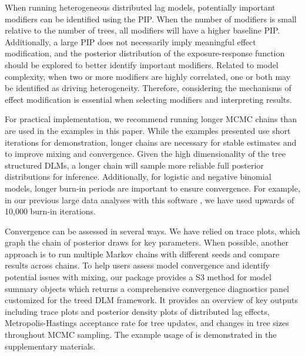 When running heterogeneous distributed lag models, potentially important modifiers can be identified using the PIP.  When the number of modifiers is small relative to the number of trees, all modifiers will have a higher baseline PIP. Additionally, a large PIP does not necessarily imply meaningful effect modification, and the posterior distribution of the exposure-response function should be explored to better identify important modifiers. Related to model complexity, when two or more modifiers are highly correlated, one or both may be identified as driving heterogeneity. Therefore, considering the mechanisms of effect modification is essential when selecting modifiers and interpreting results.

For practical implementation, we recommend running longer MCMC chains than are used in the examples in this paper. While the examples presented use short iterations for demonstration, longer chains are necessary for stable estimates and to improve mixing and convergence. Given the high dimensionality of the tree structured DLMs, a longer chain will sample more reliable full posterior distributions for inference. Additionally, for logistic and negative binomial models, longer burn-in periods are important to ensure convergence. For example, in our previous large data analyses with this software \citep{mork_estimating_2023,mork_heterogeneous_2023,mork_treed_2022}, we have used upwards of 10,000 burn-in iterations.

Convergence can be assessed in several ways. We have relied on trace plots, which graph the chain of posterior draws for key parameters. When possible, another approach is to run multiple Markov chains with different seeds and compare results across chains. To help users assess model convergence and identify potential issues with mixing, our package provides a  S3 method for model summary objects which returns a comprehensive convergence diagnostics panel customized for the treed DLM framework. It provides an overview of key outputs including trace plots and posterior density plots of distributed lag effects, Metropolis-Hastings acceptance rate for tree updates, and changes in tree sizes throughout MCMC sampling. The example usage of  is demonstrated in the supplementary materials.

